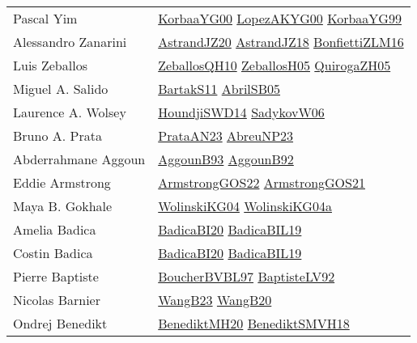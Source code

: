 {\begin{longtable}{p{4cm}p{20cm}}
Pascal Yim & \href{articles/KorbaaYG00.pdf}{KorbaaYG00}\cite{KorbaaYG00} \href{articles/LopezAKYG00.pdf}{LopezAKYG00}\cite{LopezAKYG00} \href{papers/KorbaaYG99.pdf}{KorbaaYG99}\cite{KorbaaYG99} \\
Alessandro Zanarini & \href{articles/AstrandJZ20.pdf}{AstrandJZ20}\cite{AstrandJZ20} \href{papers/AstrandJZ18.pdf}{AstrandJZ18}\cite{AstrandJZ18} \href{papers/BonfiettiZLM16.pdf}{BonfiettiZLM16}\cite{BonfiettiZLM16} \\
Luis Zeballos & \href{articles/ZeballosQH10.pdf}{ZeballosQH10}\cite{ZeballosQH10} \href{articles/ZeballosH05.pdf}{ZeballosH05}\cite{ZeballosH05} \href{papers/QuirogaZH05.pdf}{QuirogaZH05}\cite{QuirogaZH05} \\
Miguel A. Salido & \href{articles/BartakS11.pdf}{BartakS11}\cite{BartakS11} \href{papers/AbrilSB05.pdf}{AbrilSB05}\cite{AbrilSB05} \\
Laurence A. Wolsey & \href{papers/HoundjiSWD14.pdf}{HoundjiSWD14}\cite{HoundjiSWD14} \href{}{SadykovW06}\cite{SadykovW06} \\
Bruno A. Prata & \href{articles/PrataAN23.pdf}{PrataAN23}\cite{PrataAN23} \href{}{AbreuNP23}\cite{AbreuNP23} \\
Abderrahmane Aggoun & \href{articles/AggounB93.pdf}{AggounB93}\cite{AggounB93} \href{}{AggounB92}\cite{AggounB92} \\
Eddie Armstrong & \href{papers/ArmstrongGOS22.pdf}{ArmstrongGOS22}\cite{ArmstrongGOS22} \href{papers/ArmstrongGOS21.pdf}{ArmstrongGOS21}\cite{ArmstrongGOS21} \\
Maya B. Gokhale & \href{papers/WolinskiKG04.pdf}{WolinskiKG04}\cite{WolinskiKG04} \href{}{WolinskiKG04a}\cite{WolinskiKG04a} \\
Amelia Badica & \href{}{BadicaBI20}\cite{BadicaBI20} \href{papers/BadicaBIL19.pdf}{BadicaBIL19}\cite{BadicaBIL19} \\
Costin Badica & \href{}{BadicaBI20}\cite{BadicaBI20} \href{papers/BadicaBIL19.pdf}{BadicaBIL19}\cite{BadicaBIL19} \\
Pierre Baptiste & \href{}{BoucherBVBL97}\cite{BoucherBVBL97} \href{papers/BaptisteLV92.pdf}{BaptisteLV92}\cite{BaptisteLV92} \\
Nicolas Barnier & \href{papers/WangB23.pdf}{WangB23}\cite{WangB23} \href{papers/WangB20.pdf}{WangB20}\cite{WangB20} \\
Ondrej Benedikt & \href{articles/BenediktMH20.pdf}{BenediktMH20}\cite{BenediktMH20} \href{papers/BenediktSMVH18.pdf}{BenediktSMVH18}\cite{BenediktSMVH18} \\

\end{longtable}}
